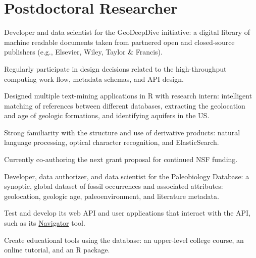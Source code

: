 \documentclass[]{deedy-resume-openfont}
\begin{document}
\begin{minipage}[t]{0.66\textwidth} 

\section{Postdoctoral Researcher}

\vspace{\topsep} %
\begin{tightemize}
\item Developer and data scientist for the GeoDeepDive initiative: a digital library of machine readable documents taken from partnered open and closed-source publishers (e.g., Elsevier, Wiley, Taylor \& Francis).
\item Regularly participate in design decisions related to the high-throughput computing work flow, metadata schemas, and API design.
\item Designed multiple text-mining applications in R with research intern: intelligent matching of references between different databases, extracting the geolocation and age of geologic formations, and identifying aquifers in the US.
\item Strong familiarity with the structure and use of derivative products: natural language processing, optical character recognition, and ElasticSearch.
\item Currently co-authoring the next grant proposal for continued NSF funding.
\end{tightemize}
\sectionsep

\begin{tightemize}
\item Developer, data authorizer, and data scientist for the Paleobiology Database: a synoptic, global dataset of fossil occurrences and associated attributes: geolocation, geologic age, paleoenvironment, and literature metadata.
\item Test and develop its web API and user applications that interact with the API, such as its \href{https://paleobiodb.org/navigator/}{Navigator} tool.
\item Create educational tools using the database: an upper-level college course, an online tutorial, and an R package.
\end{tightemize}
\sectionsep


\end{minipage}
\end{document}
